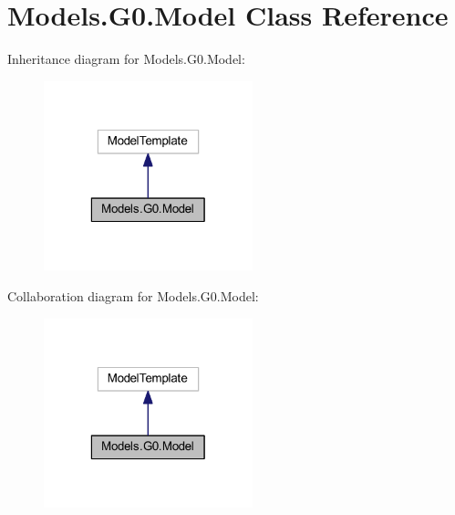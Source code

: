 \hypertarget{class_models_1_1_g0_1_1_model}{\section{Models.\-G0.\-Model Class Reference}
\label{class_models_1_1_g0_1_1_model}
}


Inheritance diagram for Models.\-G0.\-Model\-:
\nopagebreak
\begin{figure}[H]
\begin{center}
\leavevmode
\includegraphics[width=172pt]{class_models_1_1_g0_1_1_model__inherit__graph}
\end{center}
\end{figure}


Collaboration diagram for Models.\-G0.\-Model\-:
\nopagebreak
\begin{figure}[H]
\begin{center}
\leavevmode
\includegraphics[width=172pt]{class_models_1_1_g0_1_1_model__coll__graph}
\end{center}
\end{figure}

